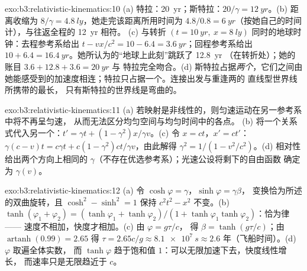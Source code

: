 \begin{solution}{exo:b3:relativistic-kinematics:10}
(a) 特拉：\qty{20}{yr}；斯特拉：$20/\gamma = \qty{12}{yr}$。(b) 距离收缩为
$8/\gamma = \qty{4.8}{ly}$，她走完该距离所用时间为 $4.8/0.8
= \qty{6}{yr}$（按她自己的时间计），与往返全程的 \qty{12}{yr} 相符。
(c) 与转折 $(t =
\qty{10}{yr},\ x = \qty{8}{ly})$ 同时的地球时钟：去程参考系给出
$t - vx/c^2 = 10 - 6.4 = \qty{3.6}{yr}$；回程参考系给出 $10 +
6.4 = \qty{16.4}{yr}$。她所认为的“地球上此刻”跳跃了 \qty{12.8}{yr}
（在转折处）；她的账目 $3.6 + 12.8 + 3.6 = \qty{20}{yr}$ 与
特拉完全吻合。(d) 斯特拉占据\emph{两个}，它们之间由
她能感受到的加速度相连；特拉只占据一个。连接出发与重逢两的
直线型世界线所携带的最长，
只有斯特拉的世界线是弯曲的。
\end{solution}

\begin{solution}{exo:b3:relativistic-kinematics:11}
(a) 若映射是非线性的，则匀速运动在另一参考系中将不再呈匀速，
从而无法区分均匀空间与均匀时间中的各点。
(b) 将一个关系式代入另一个：$t' = \gamma t +
(1 - \gamma^2)x/\gamma v$。(c) 令 $x = ct$，$x' = ct'$：
$\gamma(c - v)t = c\gamma t + c(1 - \gamma^2)ct/\gamma v$，由此解得
$\gamma^2 = 1/(1 - v^2/c^2)$。(d) 相对性给出两个方向上相同的
$\gamma$（不存在优选参考系）；光速公设将剩下的自由函数
确定为
$\gamma(v)$。
\end{solution}

\begin{solution}{exo:b3:relativistic-kinematics:12}
(a) 令 $\cosh\varphi = \gamma$，$\sinh\varphi = \gamma\beta$，
变换恰为所述的双曲旋转，且
$\cosh^2 - \sinh^2 = 1$ 保持 $c^2t^2 - x^2$ 不变。(b)
$\tanh(\varphi_1 + \varphi_2) = (\tanh\varphi_1 + \tanh\varphi_2)/(1 +
\tanh\varphi_1\tanh\varphi_2)$：恰为律——
速度不相加，快度才相加。(c) 由 $\varphi = g\tau/c$，
得 $\beta = \tanh(g\tau/c)$；由 $\operatorname{artanh}(0.99) = 2.65$ 得
$\tau = 2.65c/g \approx \qty{8.1e7}{s} \approx 2.6$ 年（飞船时间）。(d) $\varphi$ 取遍全体实数，
而 $\tanh\varphi$ 趋于饱和值
$1$：可以无限加速下去，快度线性增长，
而速率只是无限趋近于 $c$。
\end{solution}

